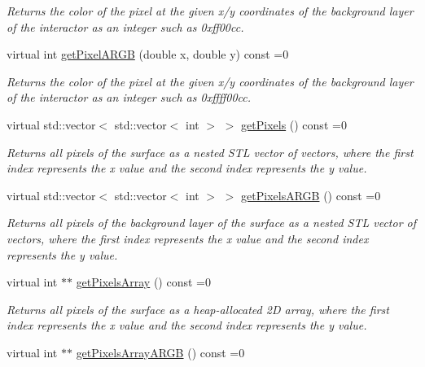 \begin{DoxyCompactItemize}
\begin{DoxyCompactList}\small\item\em Returns the color of the pixel at the given x/y coordinates of the background layer of the interactor as an integer such as 0xff00cc. \end{DoxyCompactList}\item 
virtual int \mbox{\hyperlink{classsgl_1_1GDrawingSurface_aee10de1ca7da1fc3f3fc0e48286f88f8}{get\+Pixel\+A\+R\+GB}} (double x, double y) const =0
\begin{DoxyCompactList}\small\item\em Returns the color of the pixel at the given x/y coordinates of the background layer of the interactor as an integer such as 0xffff00cc. \end{DoxyCompactList}\item 
virtual std\+::vector$<$ std\+::vector$<$ int $>$ $>$ \mbox{\hyperlink{classsgl_1_1GDrawingSurface_aaaa615cb8868420f5451082c843f8b73}{get\+Pixels}} () const =0
\begin{DoxyCompactList}\small\item\em Returns all pixels of the surface as a nested S\+TL vector of vectors, where the first index represents the x value and the second index represents the y value. \end{DoxyCompactList}\item 
virtual std\+::vector$<$ std\+::vector$<$ int $>$ $>$ \mbox{\hyperlink{classsgl_1_1GDrawingSurface_ad3338953d25c3863e554fa40f0529994}{get\+Pixels\+A\+R\+GB}} () const =0
\begin{DoxyCompactList}\small\item\em Returns all pixels of the background layer of the surface as a nested S\+TL vector of vectors, where the first index represents the x value and the second index represents the y value. \end{DoxyCompactList}\item 
virtual int $\ast$$\ast$ \mbox{\hyperlink{classsgl_1_1GDrawingSurface_ab42bd04a0a8ad87ec0c7e9856e4da3ac}{get\+Pixels\+Array}} () const =0
\begin{DoxyCompactList}\small\item\em Returns all pixels of the surface as a heap-\/allocated 2D array, where the first index represents the x value and the second index represents the y value. \end{DoxyCompactList}\item 
virtual int $\ast$$\ast$ \mbox{\hyperlink{classsgl_1_1GDrawingSurface_a5bd493d4580fad7e9ebd97871c959276}{get\+Pixels\+Array\+A\+R\+GB}} () const =0

\end{DoxyCompactItemize}
